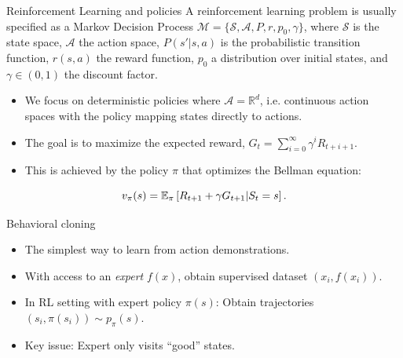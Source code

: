 \begin{frame}{Reinforcement Learning and policies}
    A reinforcement learning problem is usually specified as a Markov Decision Process $\mathcal{M} = \{\mathcal{S}, \mathcal{A}, P, r, p_0, \gamma\}$, where $\mathcal{S}$ is the state space, $\mathcal{A}$ the action space, $P(s'|s,a)$ is the probabilistic transition function, $r(s,a)$ the reward function, $p_0$ a distribution over initial states, and $\gamma \in (0,1)$ the discount factor. 
    \begin{itemize}
        \item We focus on deterministic policies where $\mathcal{A} = \mathbb{R}^d$, i.e. continuous action spaces with the policy mapping states directly to actions.
        \item The goal is to maximize the expected reward, $G_t = \sum_{i=0}^\infty \gamma^i R_{t+i+1}$. 
        \item This is achieved by the policy $\pi$ that optimizes the Bellman equation:
    \end{itemize}
    \begin{equation*}
        v_\pi(s) = \operatorname{\mathbb{E}}_\pi\left[R_{t+1} + \gamma G_{t+1} | S_t=s\right].
    \end{equation*}

\end{frame}

\begin{frame}{Behavioral cloning}
    \begin{itemize}
        \item The simplest way to learn from action demonstrations.
        \item With access to an \emph{expert} $f(x)$, obtain supervised dataset $(x_i, f(x_i))$.
        \item In RL setting with expert policy $\pi(s)$: Obtain trajectories $(s_i, \pi(s_i)) \sim p_\pi(s)$.
        \item Key issue: Expert only visits \enquote{good} states.
    \end{itemize}
    
\end{frame}

